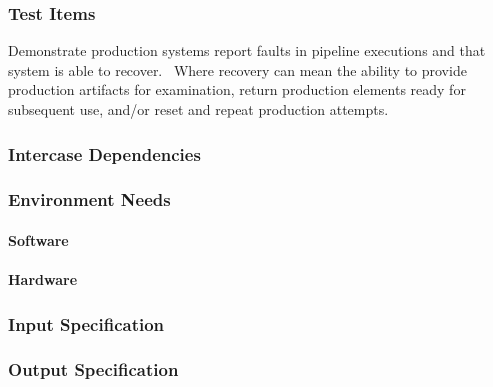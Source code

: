 \subsubsection{Test Items}
Demonstrate production systems report faults in pipeline executions and
that system is able to recover. ~Where recovery can mean the ability to
provide production artifacts for examination, return production elements
ready for subsequent use, and/or reset and repeat production attempts.



\subsubsection{Intercase Dependencies}

\subsubsection{Environment Needs}

\paragraph{Software}

\paragraph{Hardware}

\subsubsection{Input Specification}

\subsubsection{Output Specification}

